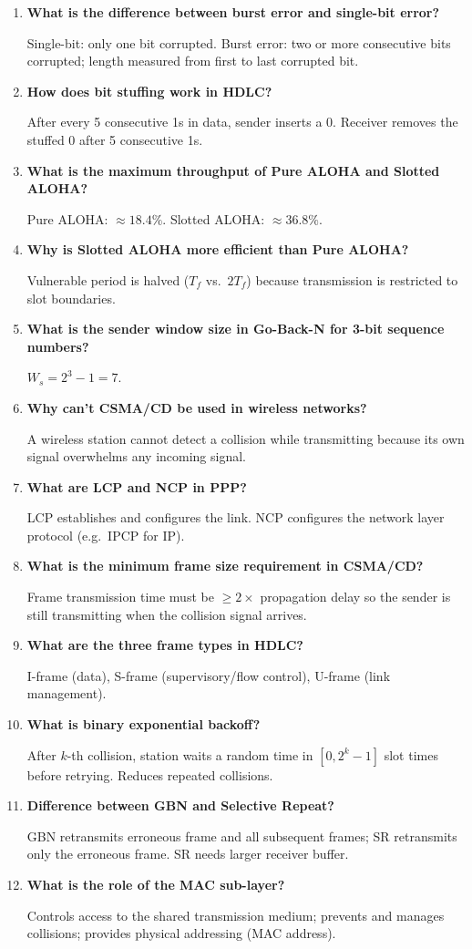 \documentclass[12pt,a4paper]{article}
\newcommand{\Q}[1]{\textbf{#1}\par\noindent\ignorespaces}
\begin{document}
\begin{tcolorbox}[exambox, title={\textbf{Frequently Asked / Viva Questions}}]
\begin{enumerate}[leftmargin=*, topsep=0pt, label=\textbf{Q\arabic*.}, itemsep=8pt]
  \item \Q{What is the difference between burst error and single-bit error?} Single-bit: only one bit corrupted. Burst error: two or more consecutive bits corrupted; length measured from first to last corrupted bit.
  \item \Q{How does bit stuffing work in HDLC?} After every 5 consecutive 1s in data, sender inserts a 0. Receiver removes the stuffed 0 after 5 consecutive 1s.
  \item \Q{What is the maximum throughput of Pure ALOHA and Slotted ALOHA?} Pure ALOHA: $\approx 18.4\%$. Slotted ALOHA: $\approx 36.8\%$.
  \item \Q{Why is Slotted ALOHA more efficient than Pure ALOHA?} Vulnerable period is halved ($T_f$ vs.\ $2T_f$) because transmission is restricted to slot boundaries.
  \item \Q{What is the sender window size in Go-Back-N for 3-bit sequence numbers?} $W_s = 2^3 - 1 = 7$.
  \item \Q{Why can't CSMA/CD be used in wireless networks?} A wireless station cannot detect a collision while transmitting because its own signal overwhelms any incoming signal.
  \item \Q{What are LCP and NCP in PPP?} LCP establishes and configures the link. NCP configures the network layer protocol (e.g.\ IPCP for IP).
  \item \Q{What is the minimum frame size requirement in CSMA/CD?} Frame transmission time must be $\geq 2 \times$ propagation delay so the sender is still transmitting when the collision signal arrives.
  \item \Q{What are the three frame types in HDLC?} I-frame (data), S-frame (supervisory/flow control), U-frame (link management).
  \item \Q{What is binary exponential backoff?} After $k$-th collision, station waits a random time in $[0, 2^k - 1]$ slot times before retrying. Reduces repeated collisions.
  \item \Q{Difference between GBN and Selective Repeat?} GBN retransmits erroneous frame and all subsequent frames; SR retransmits only the erroneous frame. SR needs larger receiver buffer.
  \item \Q{What is the role of the MAC sub-layer?} Controls access to the shared transmission medium; prevents and manages collisions; provides physical addressing (MAC address).
\end{enumerate}
\end{tcolorbox}
\end{document}
